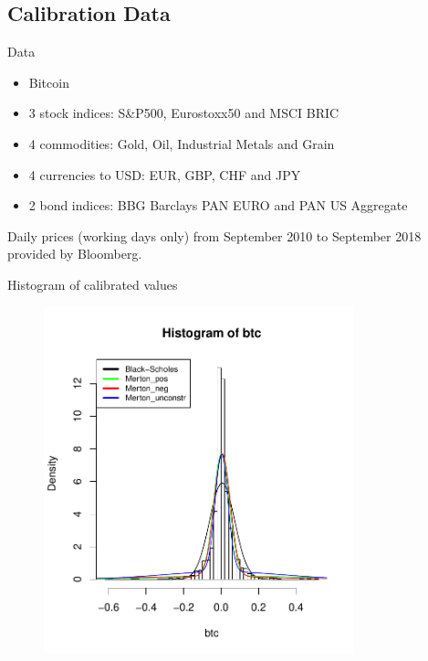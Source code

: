 \documentclass{beamer}
\begin{document}
\subsection{Calibration Data}
\begin{frame}{Data}
\begin{itemize}
    \item Bitcoin
    \item 3 stock indices: S\&P500, Eurostoxx50 and MSCI BRIC
    \item 4 commodities: Gold, Oil, Industrial Metals and Grain
    \item 4 currencies  to USD: EUR, GBP, CHF and JPY
    \item 2 bond indices: BBG Barclays PAN EURO and PAN US Aggregate
\end{itemize}

Daily prices (working days only) from September 2010 to September 2018 provided by Bloomberg.

\end{frame}

\begin{frame}{Histogram of calibrated values}
\begin{figure}
\includegraphics[width=0.8\textwidth]{historgram_10percent.pdf}
\label{roll_stocks}
\end{figure}
\end{frame}
\end{document}
